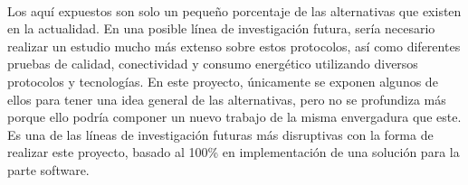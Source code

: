 \documentclass[../../memoria.tex]{subfiles}
\begin{document}
\paragraph{}
Los aquí expuestos son solo un pequeño porcentaje de las alternativas que existen en la actualidad. En una posible línea de investigación futura, sería necesario realizar un estudio mucho más extenso sobre estos protocolos, así como diferentes pruebas de calidad, conectividad y consumo energético utilizando diversos protocolos y tecnologías. En este proyecto, únicamente se exponen algunos de ellos para tener una idea general de las alternativas, pero no se profundiza más porque ello podría componer un nuevo trabajo de la misma envergadura que este. Es una de las líneas de investigación futuras más disruptivas con la forma de realizar este proyecto, basado al 100\% en implementación de una solución para la parte software.
\end{document}
